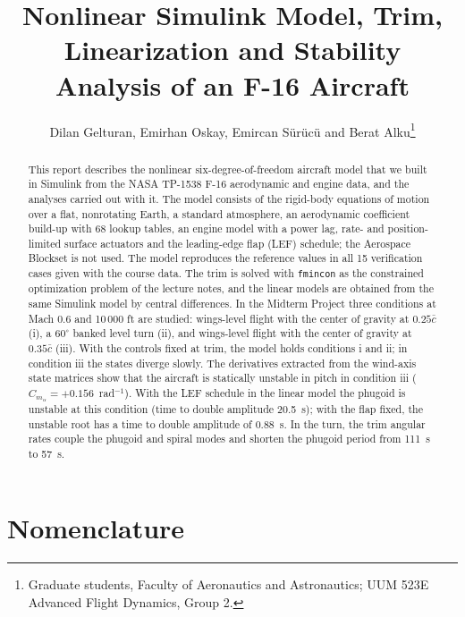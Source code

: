 \documentclass[conf]{new-aiaa}
\title{Nonlinear Simulink Model, Trim, Linearization and Stability Analysis of an F-16 Aircraft}
\author{Dilan Gelturan, Emirhan Oskay, Emircan S\"ur\"uc\"u and Berat Alku\footnote{Graduate students, Faculty of Aeronautics and Astronautics; UUM 523E Advanced Flight Dynamics, Group 2.}}
\affil{Istanbul Technical University, 34469 Maslak, Istanbul, Turkey}
\begin{document}
\maketitle

\begin{abstract}
This report describes the nonlinear six-degree-of-freedom aircraft model that we built in Simulink from the NASA TP-1538 F-16 aerodynamic and engine data, and the analyses carried out with it. The model consists of the rigid-body equations of motion over a flat, nonrotating Earth, a standard atmosphere, an aerodynamic coefficient build-up with 68 lookup tables, an engine model with a power lag, rate- and position-limited surface actuators and the leading-edge flap (LEF) schedule; the Aerospace Blockset is not used. The model reproduces the reference values in all 15 verification cases given with the course data. The trim is solved with \texttt{fmincon} as the constrained optimization problem of the lecture notes, and the linear models are obtained from the same Simulink model by central differences. In the Midterm Project three conditions at Mach 0.6 and 10\,000 ft are studied: wings-level flight with the center of gravity at $0.25\bar c$ (i), a $60^\circ$ banked level turn (ii), and wings-level flight with the center of gravity at $0.35\bar c$ (iii). With the controls fixed at trim, the model holds conditions i and ii; in condition iii the states diverge slowly. The derivatives extracted from the wind-axis state matrices show that the aircraft is statically unstable in pitch in condition iii ($C_{m_\alpha}=+0.156$~rad$^{-1}$). With the LEF schedule in the linear model the phugoid is unstable at this condition (time to double amplitude 20.5~s); with the flap fixed, the unstable root has a time to double amplitude of 0.88~s. In the turn, the trim angular rates couple the phugoid and spiral modes and shorten the phugoid period from 111~s to 57~s.
\end{abstract}

\section*{Nomenclature}
\end{document}
